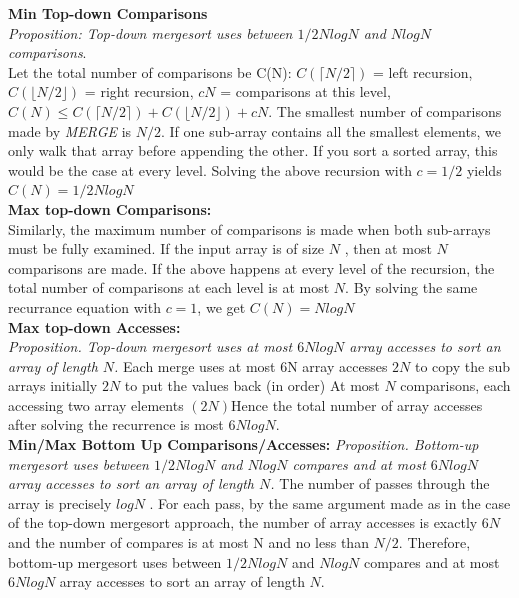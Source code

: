 \documentclass[letterpaper, 8pt]{extarticle}
\begin{document}
\begin{multicols*}{5}
  \textbf{Min Top-down Comparisons}\\
  \textit{Proposition: Top-down mergesort uses between $1/2N log N$ and $N log N$ comparisons}.\\
  Let the total number of comparisons be C(N): $C(\lceil N/2 \rceil)$ = left recursion, $C(\lfloor N/2 \rfloor)$ = right recursion, $cN$ = comparisons at this level, $C (N) \leq C(\lceil N/2 \rceil) + C(\lfloor N / 2 \rfloor ) + cN$. The smallest number of comparisons made by \textit{MERGE} is $N/2$. If one sub-array contains all the smallest elements, we only walk that array before appending the other. If you sort a sorted array, this would be the case at every level. Solving the above recursion with $c = 1/2$ yields $C(N) = 1/2 N log N$\\
  \textbf{Max top-down Comparisons:}\\
  Similarly, the maximum number of comparisons is made when both sub-arrays must be fully examined. If the input array is of size $N$ , then at most $N$ comparisons are made. If the above happens at every level of the recursion, the total number of comparisons at each level is at most $N$. By solving the same recurrance equation with $c = 1$, we get $C(N ) = N log N$\\

  \textbf{Max top-down Accesses:}\\
  \textit{Proposition. Top-down mergesort uses at most $6N log N$ array accesses to sort an array of length $N$.} Each merge uses at most 6N array accesses
  $2N$ to copy the sub arrays initially
  $2N$ to put the values back (in order)
  At most $N$ comparisons, each accessing two array elements $(2N)$Hence the total number of array accesses after solving the recurrence is most $6N log N$.\\
  \textbf{Min/Max Bottom Up Comparisons/Accesses:}
  \textit{Proposition. Bottom-up mergesort uses between $1/2N log N$ and $N log N$
    compares and at most $6N log N$ array accesses to sort an array of length $N$.}
  The number of passes through the array is precisely $log N$ . For each pass, by the same argument made as in the case of the
  top-down mergesort approach, the number of array accesses is exactly $6N$ and the number of compares is at most N and no less than $N/2$. Therefore, bottom-up mergesort uses between $1/2N log N$ and $N log N$ compares and at most $6N log N$ array accesses to sort an array of length
  $N$.\\


\end{multicols*}
\end{document}
